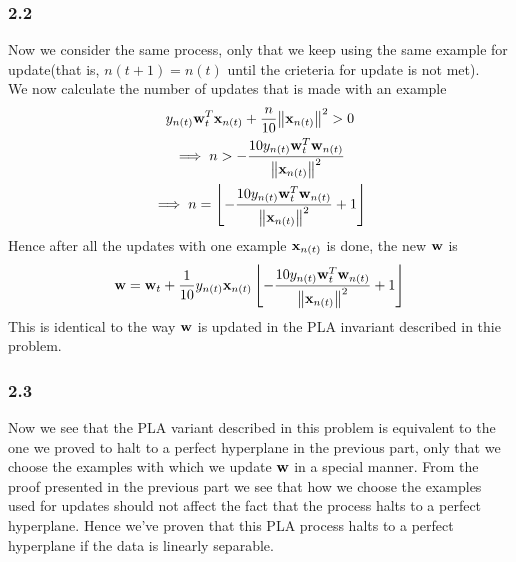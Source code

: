 \documentclass[11pt]{article}
\theoremstyle{definition}
\begin{document}
\subsubsection*{2.2}
Now we consider the same process, only that we keep using the same example for update(that is, $n(t+1) = n(t)$ until the crieteria for update is not met). \\ 
We now calculate the number of updates that is made with an example 
\begin{gather*}
  y_{n(t)}\vb{w}_t^T\vb{x}_{n(t)} + \frac{n}{10}\norm{\vb{x}_{n(t)}}^2 > 0 \\ 
  \implies n > -\frac{10y_{n(t)}\vb{w}_t^T\vb{w}_{n(t)}}{\norm{\vb{x}_{n(t)}}^2} \\ 
  \implies n = \left\lfloor-\frac{10y_{n(t)}\vb{w}_t^T\vb{w}_{n(t)}}{\norm{\vb{x}_{n(t)}}^2} + 1\right\rfloor
\end{gather*}
Hence after all the updates with one example $\vb{x}_{n(t)}$ is done, the new $\vb{w}$ is 
\[
  \vb{w} = \vb{w}_t + \frac{1}{10}y_{n(t)}\vb{x}_{n(t)}\left\lfloor-\frac{10y_{n(t)}\vb{w}_t^T\vb{w}_{n(t)}}{\norm{\vb{x}_{n(t)}}^2} + 1\right\rfloor
\]
This is identical to the way $\vb{w}$ is updated in the PLA invariant described in thie problem.
\subsubsection*{2.3}
Now we see that the PLA variant described in this problem is equivalent to the one we proved to halt to a perfect hyperplane in the previous part, only that we choose the examples with which we update $\vb{w}$ in a special manner. From the proof presented in the previous part we see that how we choose the examples used for updates should not affect the fact that the process halts to a perfect hyperplane. Hence we've proven that this PLA process halts to a perfect hyperplane if the data is linearly separable.
\end{document}
